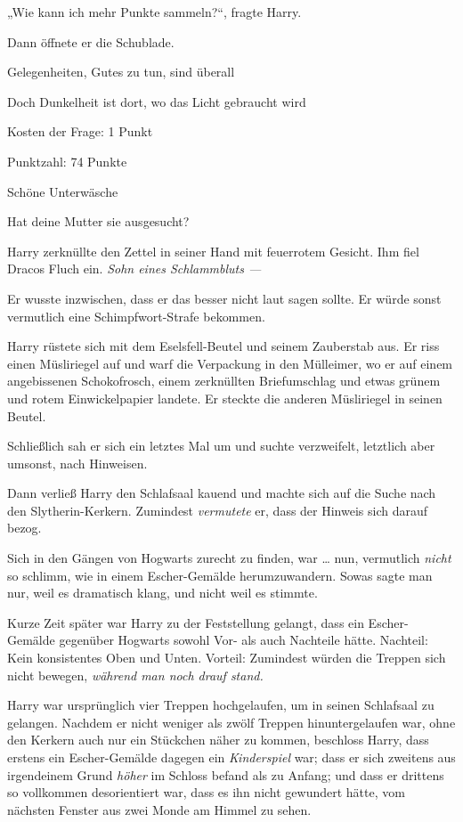 {„Wie kann ich mehr Punkte sammeln?“, fragte Harry.

Dann öffnete er die Schublade.

Gelegenheiten, Gutes zu tun, sind überall

Doch Dunkelheit ist dort, wo das Licht gebraucht wird

Kosten der Frage: 1 Punkt

Punktzahl: 74 Punkte

Schöne Unterwäsche

Hat deine Mutter sie ausgesucht?

Harry zerknüllte den Zettel in seiner Hand mit feuerrotem Gesicht. Ihm fiel Dracos Fluch ein. \emph{Sohn eines Schlammbluts ---}

Er wusste inzwischen, dass er das besser nicht laut sagen sollte. Er würde sonst vermutlich eine Schimpfwort-Strafe bekommen.

Harry rüstete sich mit dem Eselsfell-Beutel und seinem Zauberstab aus. Er riss einen Müsliriegel auf und warf die Verpackung in den Mülleimer, wo er auf einem angebissenen Schokofrosch, einem zerknüllten Briefumschlag und etwas grünem und rotem Einwickelpapier landete. Er steckte die anderen Müsliriegel in seinen Beutel.

Schließlich sah er sich ein letztes Mal um und suchte verzweifelt, letztlich aber umsonst, nach Hinweisen.

Dann verließ Harry den Schlafsaal kauend und machte sich auf die Suche nach den Slytherin-Kerkern. Zumindest \emph{vermutete} er, dass der Hinweis sich darauf bezog.

Sich in den Gängen von Hogwarts zurecht zu finden, war … nun, vermutlich \emph{nicht} so schlimm, wie in einem Escher-Gemälde herumzuwandern. Sowas sagte man nur, weil es dramatisch klang, und nicht weil es stimmte.

Kurze Zeit später war Harry zu der Feststellung gelangt, dass ein Escher-Gemälde gegenüber Hogwarts sowohl Vor- als auch Nachteile hätte. Nachteil: Kein konsistentes Oben und Unten. Vorteil: Zumindest würden die Treppen sich nicht bewegen, \emph{während man noch drauf stand.}

Harry war ursprünglich vier Treppen hochgelaufen, um in seinen Schlafsaal zu gelangen. Nachdem er nicht weniger als zwölf Treppen hinuntergelaufen war, ohne den Kerkern auch nur ein Stückchen näher zu kommen, beschloss Harry, dass erstens ein Escher-Gemälde dagegen ein \emph{Kinderspiel} war; dass er sich zweitens aus irgendeinem Grund \emph{höher} im Schloss befand als zu Anfang; und dass er drittens so vollkommen desorientiert war, dass es ihn nicht gewundert hätte, vom nächsten Fenster aus zwei Monde am Himmel zu sehen.

}
